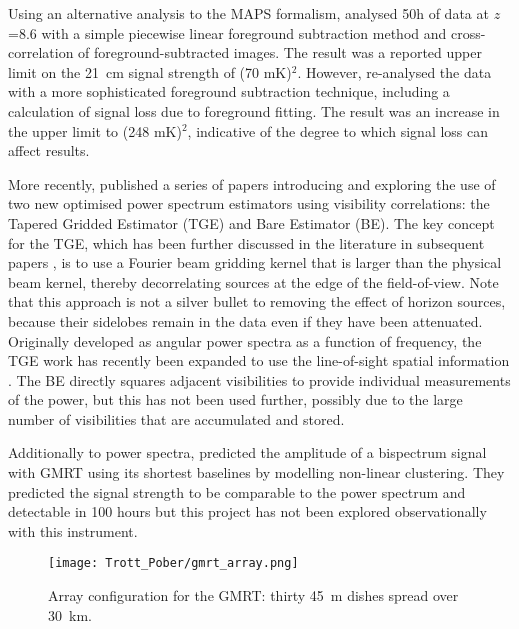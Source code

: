 Using an alternative analysis to the MAPS formalism, \cite{paciga11} analysed 50h of data at $z$=8.6 with a simple piecewise linear foreground subtraction method and cross-correlation of foreground-subtracted images.  The result was a reported upper limit on the 21~cm signal strength of (70 mK)$^2$.
However, \cite{paciga13} re-analysed the data with a more sophisticated foreground subtraction technique, including a calculation of signal loss due to foreground fitting. The result was an increase in the upper limit to (248 mK)$^2$, indicative of the degree to which signal loss can affect results.

More recently, \cite{chouduri14} published a series of papers introducing and exploring the use of two new optimised power spectrum estimators using visibility correlations: the Tapered Gridded Estimator (TGE) and Bare Estimator (BE). The key concept for the TGE, which has been further discussed in the literature in subsequent papers \cite{2016MNRAS.463.4093C}, is to use a Fourier beam gridding kernel that is larger than the physical beam kernel, thereby decorrelating sources at the edge of the field-of-view. 
Note that this approach is not a silver bullet to removing the effect of horizon sources, because their sidelobes remain in the data even if they have been attenuated. Originally developed as angular power spectra as a function of frequency, the TGE work has recently been expanded to use the line-of-sight spatial information \cite{bharadwaj19}. The BE directly squares adjacent visibilities to provide individual measurements of the power, but this has not been used further, possibly due to the large number of visibilities that are accumulated and stored.

Additionally to power spectra, \cite{ali06} predicted the amplitude of a bispectrum signal with GMRT using its shortest baselines by modelling non-linear clustering. They predicted the signal strength to be comparable to the power spectrum and detectable in 100 hours but this project has not been explored observationally with this instrument.
\begin{figure}[ht]
\centering
\texttt{[image: Trott\_Pober/gmrt\_array.png]}
\caption{Array configuration for the GMRT: thirty 45~m dishes spread over 30~km.}\label{fig:gmrt}
\end{figure}


